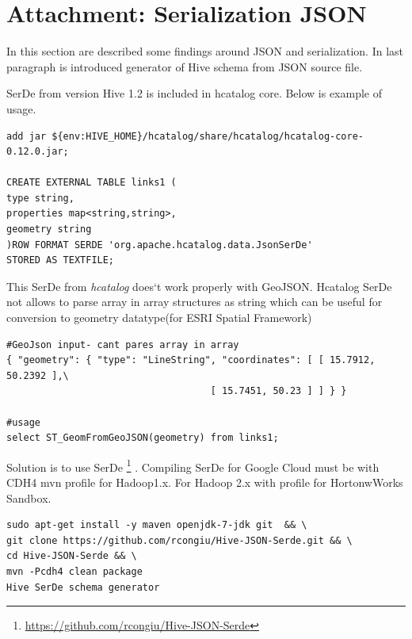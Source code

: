 \documentclass[a4paper,12pt,oneside]{report}
\begin{document}
\newpage	
		
	\section{Attachment: Serialization JSON}\label{serde}
	
In this section are described some findings around JSON and serialization. In
last paragraph is introduced generator of Hive schema from JSON source file.

SerDe from version Hive 1.2 is included in hcatalog core. Below is example of
usage.
		\begin{footnotesize}
			\begin{lstlisting}[style=python]
add jar ${env:HIVE_HOME}/hcatalog/share/hcatalog/hcatalog-core-0.12.0.jar;

CREATE EXTERNAL TABLE links1 (
type string,
properties map<string,string>,
geometry string
)ROW FORMAT SERDE 'org.apache.hcatalog.data.JsonSerDe'
STORED AS TEXTFILE;
			\end{lstlisting}
		\end{footnotesize}

This SerDe from \textit{hcatalog} does`t work properly with GeoJSON. Hcatalog
SerDe not allows to parse array in array structures as string which can be
useful for conversion to geometry  datatype(for ESRI Spatial Framework)
		\begin{footnotesize}
			\begin{lstlisting}[style=python]
#GeoJson input- cant pares array in array
{ "geometry": { "type": "LineString", "coordinates": [ [ 15.7912, 50.2392 ],\
 				                	[ 15.7451, 50.23 ] ] } }

#usage
select ST_GeomFromGeoJSON(geometry) from links1;
			\end{lstlisting}
		\end{footnotesize}

Solution is to use SerDe
\footnote{\url{https://github.com/rcongiu/Hive-JSON-Serde}} . Compiling SerDe
for Google Cloud must be with CDH4 mvn profile for Hadoop1.x. For Hadoop 2.x
with profile for HortonwWorks Sandbox.
		\begin{footnotesize}
			\begin{lstlisting}[style=python]
sudo apt-get install -y maven openjdk-7-jdk git  && \
git clone https://github.com/rcongiu/Hive-JSON-Serde.git && \
cd Hive-JSON-Serde && \
mvn -Pcdh4 clean package
Hive SerDe schema generator
			\end{lstlisting}
		\end{footnotesize}
\end{document}
